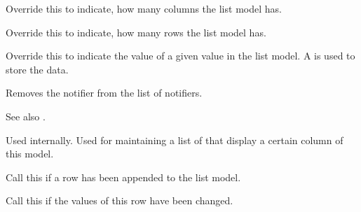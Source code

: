 \label{wxdataviewlistmodelgetnumberofcols}


Override this to indicate, how many columns the list
model has.

\label{wxdataviewlistmodelgetnumberofrows}


Override this to indicate, how many rows the list
model has.

\label{wxdataviewlistmodelgetvalue}


Override this to indicate the value of a given value
in the list model. A 
is used to store the data.

\label{wxdataviewlistmodelremovenotifier}


Removes the notifier from the list of notifiers.

See also .

\label{wxdataviewlistmodelremoveviewingcolumn}


Used internally. Used for maintaining a list of
 that
display a certain column of this model.

\label{wxdataviewlistmodelrowappended}


Call this if a row has been appended to the list model.

\label{wxdataviewlistmodelrowchanged}


Call this if the values of this row have been changed.

